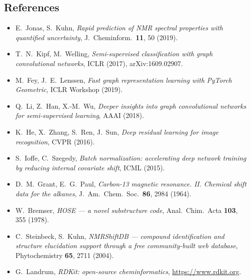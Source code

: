 \documentclass[11pt]{article}
\begin{document}
\subsection*{References}
{\small\sloppy
\begin{itemize}[nosep, leftmargin=1.2em]
  \item E.~Jonas, S.~Kuhn, \textit{Rapid prediction of NMR spectral properties with quantified uncertainty}, J.\ Cheminform.\ \textbf{11}, 50 (2019).
  \item T.~N.~Kipf, M.~Welling, \textit{Semi-supervised classification with graph convolutional networks}, ICLR (2017), arXiv:1609.02907.
  \item M.~Fey, J.~E.~Lenssen, \textit{Fast graph representation learning with PyTorch Geometric}, ICLR Workshop (2019).
  \item Q.~Li, Z.~Han, X.-M.~Wu, \textit{Deeper insights into graph convolutional networks for semi-supervised learning}, AAAI (2018).
  \item K.~He, X.~Zhang, S.~Ren, J.~Sun, \textit{Deep residual learning for image recognition}, CVPR (2016).
  \item S.~Ioffe, C.~Szegedy, \textit{Batch normalization: accelerating deep network training by reducing internal covariate shift}, ICML (2015).
  \item D.~M.~Grant, E.~G.~Paul, \textit{Carbon-13 magnetic resonance. II. Chemical shift data for the alkanes}, J.\ Am.\ Chem.\ Soc.\ \textbf{86}, 2984 (1964).
  \item W.~Bremser, \textit{HOSE --- a novel substructure code}, Anal.\ Chim.\ Acta \textbf{103}, 355 (1978).
  \item C.~Steinbeck, S.~Kuhn, \textit{NMRShiftDB --- compound identification and structure elucidation support through a free community-built web database}, Phytochemistry \textbf{65}, 2711 (2004).
  \item G.~Landrum, \textit{RDKit: open-source cheminformatics}, \url{https://www.rdkit.org}.
\end{itemize}}
\end{document}
